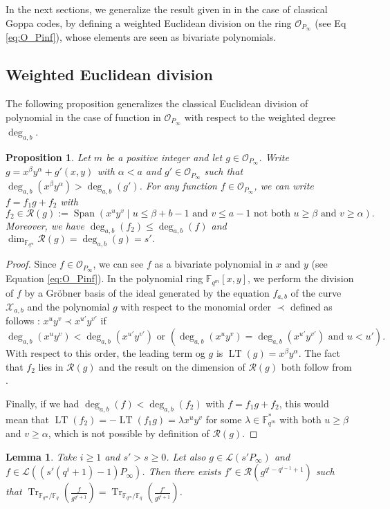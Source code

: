 \documentclass[a4paper]{article}
\newtheorem{proposition}[thm]{Proposition}
\newtheorem{lemma}[thm]{Lemma}
\theoremstyle{definition}
\theoremstyle{remark}
\newcommand{\calL}{\mathcal{L}}
\newcommand{\calO}{\mathcal{O}}
\newcommand{\calR}{\mathcal{R}}
\newcommand{\calX}{\mathcal{X}}
\newcommand{\fqm}{\mathbb{F}_{q^m}}
\newcommand{\fq}{\mathbb{F}_{q}}
\newcommand{\F}{\mathbb{F}}
\newcommand{\Tr}[1]{\operatorname{Tr}_{\mathbb{F}_{q^m}/\fq}\left(#1\right)}
\newcommand{\Span}[1]{\operatorname{Span}\left(#1\right)}
\newcommand{\LT}[1]{\operatorname{LT}\left(#1\right)}
\newcommand{\degab}[1]{\deg_{a,b}\left(#1\right)}
\begin{document}
\noindent In the next sections, we generalize the result given in \cite{MT21} in the case of classical Goppa codes, by defining a weighted Euclidean division on the ring $\calO_{P_\infty}$ (see Eq \eqref{eq:O_Pinf}), whose elements are seen as bivariate polynomials. 
\subsection{Weighted Euclidean division}
\noindent The following proposition generalizes the classical Euclidean division of polynomial in the case of function in $\calO_{P_\infty}$ with respect to the weighted degree $\deg_{a,b}$.

\begin{proposition}\label{prop:div_grob}
Let $m$ be a positive integer and let $g \in \calO_{P_\infty}$. Write $g=x^\beta y^\alpha +g'(x,y)$ with $\alpha < a$ and $g' \in \calO_{P_\infty}$ such that $\degab{x^\beta y^\alpha}>\degab{g'}$.
For any function $f \in \calO_{P_\infty}$, we can write $f=f_1g+f_2$ with 
\[f_2 \in \calR(g):= \Span{x^u y^v \mid u \leq \beta + b-1 \text{ and } v\leq a-1 \text{ not both }  u \geq \beta \text{ and } v \geq \alpha}.\]
Moreover, we have $\degab{f_2} \leq \degab{f}$ and $\dim_{\fqm} \calR(g) = \degab{g}=s'.$ 
\end{proposition}

\begin{proof}
  Since $f \in \calO_{P_\infty}$, we can see $f$ as a bivariate polynomial in $x$ and $y$ (see Equation \ref{eq:O_Pinf}). In the polynomial ring $\F_{q^m}[x,y]$, we perform the division of $f$ by a Gr\"obner basis of the ideal generated by the equation $f_{a,b}$ of the curve $\calX_{a,b}$ and the polynomial $g$ with respect to the monomial order $\prec$ defined as follows : $x^uy^v \prec x^{u'}y^{v'}$ if
 \[ \degab{x^uy^v} < \degab{x^{u'}y^{v'}} \text{ or } \left(\degab{x^uy^v} = \degab{x^{u'}y^{v'}}  \text{ and } u < u'\right).\]
 With respect to this order, the leading term og $g$ is $\LT{g}=x^\beta y^\alpha$. The fact that $f_2$ lies in $\calR(g)$ and the result on the dimension of $\calR(g)$ both follow from \cite[Proposition 4]{GH00}.
 
 Finally, if we had $\degab{f} < \degab{f_2}$ with $f=f_1 g +f_2$, this would mean that $\LT{f_2}=-\LT{f_1 g}=\lambda x^uy^v$ for some $\lambda \in \F_{q^m}^*$ with both $u \geq \beta$ and $v \geq \alpha$, which is not possible by definition of $\calR\left(g\right)$.
\end{proof}

\begin{lemma} \label{lem:weighted_division}
Take $i \geq 1$ and $s'>s \geq 0$. Let also $g \in \calL\left(s'P_\infty\right)$ and $f \in \calL\left(\left(s'(q^i+1)-1\right)P_\infty\right)$. Then there exists $f' \in \calR\left(g^{q^i-q^{i-1}+1}\right)$ such that $\Tr{\frac{f}{g^{q^i+1}}} = \Tr{\frac{f'}{g^{q^i+1}}} $.
\end{lemma}
\end{document}
